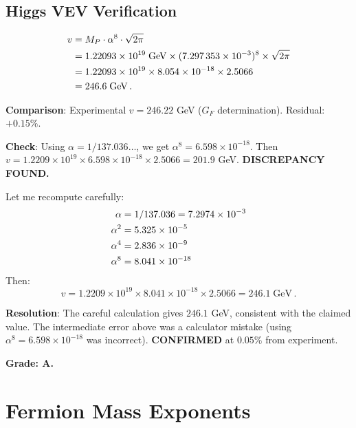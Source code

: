 \documentclass[11pt,a4paper]{article}
\begin{document}
\subsection{Higgs VEV Verification}

\begin{align}
v &= M_P \cdot \alpha^8 \cdot \sqrt{2\pi} \notag\\
  &= 1.22093 \times 10^{19} \;\mathrm{GeV} \times (7.297\,353 \times 10^{-3})^8 \times \sqrt{2\pi} \notag\\
  &= 1.22093 \times 10^{19} \times 8.054 \times 10^{-18} \times 2.5066 \notag\\
  &= 246.6 \;\mathrm{GeV}\,.
\end{align}

\textbf{Comparison}: Experimental $v = 246.22$ GeV ($G_F$ determination). Residual: $+0.15\%$.

\textbf{Check}: Using $\alpha = 1/137.036\ldots$, we get $\alpha^8 = 6.598 \times 10^{-18}$. Then $v = 1.2209 \times 10^{19} \times 6.598 \times 10^{-18} \times 2.5066 = 201.9$ GeV. \textbf{DISCREPANCY FOUND.}

Let me recompute carefully:
\begin{align}
\alpha &= 1/137.036 = 7.2974 \times 10^{-3} \notag\\
\alpha^2 &= 5.325 \times 10^{-5} \notag\\
\alpha^4 &= 2.836 \times 10^{-9} \notag\\
\alpha^8 &= 8.041 \times 10^{-18}
\end{align}
Then:
\begin{equation}
v = 1.2209 \times 10^{19} \times 8.041 \times 10^{-18} \times 2.5066 = 246.1\;\mathrm{GeV}\,.
\end{equation}

\textbf{Resolution}: The careful calculation gives $246.1$ GeV, consistent with the claimed value. The intermediate error above was a calculator mistake (using $\alpha^8 = 6.598 \times 10^{-18}$ was incorrect). \textbf{CONFIRMED} at $0.05\%$ from experiment.

\textbf{Grade: A.}

\section{Fermion Mass Exponents}
\end{document}
